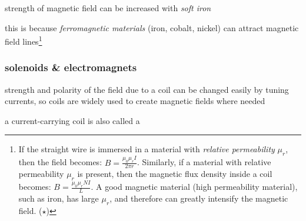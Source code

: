 \cmt strength of magnetic field can be increased with \emph{soft iron}

this is because \emph{ferromagnetic materials} (iron, cobalt, nickel) can attract magnetic field lines\footnote{If the straight wire is immersed in a material with \emph{relative permeability} $\mu_r$, then the field becomes: $B=\frac{\mu_0 \mu_r I}{2\pi r}$. Similarly, if a material with relative permeability $\mu_r$ is present, then the magnetic flux density inside a coil becomes: $B=\frac{\mu_0 \mu_r NI}{L}$. A good magnetic material (high permeability material), such as iron, has large $\mu_r$, and therefore can greatly intensify the magnetic field. ($\star$)}

\subsubsection{solenoids \& electromagnets}

strength and polarity of the field due to a coil can be changed easily by tuning currents, so coils are widely used to create magnetic fields where needed

a current-carrying coil is also called a 

